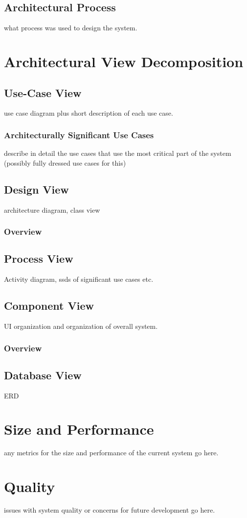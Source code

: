 \documentclass[11pt]{article}
\begin{document}
\subsection{Architectural Process}
what process was used to design the system.
\section{Architectural View Decomposition}
\subsection{Use-Case View}
use case diagram plus short description of each use case.
\subsubsection{Architecturally Significant Use Cases}
describe in detail the use cases that use the most critical part of the system (possibly fully dressed use cases for this)
\subsection{Design View}
architecture diagram, class view
\subsubsection{Overview}
\subsection{Process View}
Activity diagram, ssds of significant use cases etc.
\subsection{Component View}
UI organization and organization of overall system.
\subsubsection{Overview}
\subsection{Database View}
ERD
\section{Size and Performance}
any metrics for the size and performance of the current system go here.
\section{Quality}
issues with system quality or concerns for future development go here.
\end{document}
